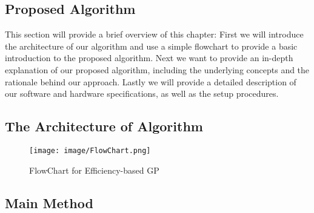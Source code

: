 \begin{ZhChapter}

\chapter{Proposed Algorithm}
This section will provide a brief overview of this chapter: First we will introduce the architecture of our algorithm and use a simple flowchart to provide a basic introduction to the proposed algorithm. Next we want to provide an in-depth explanation of our proposed algorithm, including the underlying concepts and the rationale behind our approach. Lastly we will provide a detailed description of our software and hardware specifications, as well as the setup procedures.
\section{The Architecture of Algorithm} %
\begin{figure*}[htbp]
    \centering
    \texttt{[image: image/FlowChart.png]}
    \caption{FlowChart for Efficiency-based GP}
    \label{fig: FlowChart}
\end{figure*}



\section{Main Method}


\end{ZhChapter}
